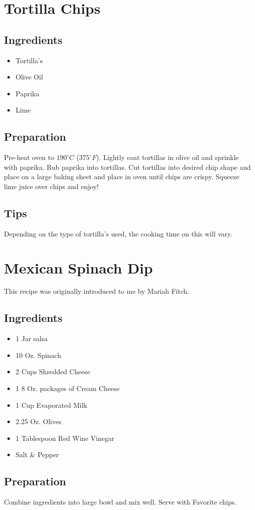 \thispagestyle{fancy}
\section{Tortilla Chips}
\AddToShipoutPicture*{\TortillaChips}

\subsection*{Ingredients}
\begin{multicols}{3}
	\begin{itemize}
		\item Tortilla's
		\item Olive Oil
		\item Paprika
		\item Lime
	\end{itemize}
\end{multicols}

\subsection*{Preparation}

Pre-heat oven to $190^\circ C$ ($375^\circ F$). Lightly coat tortillas in olive oil and sprinkle with paprika. Rub paprika into tortillas. Cut tortillas into desired chip shape and place on a large baking sheet and place in oven until chips are crispy. Squeeze lime juice over chips and enjoy!

\subsection*{Tips}

Depending on the type of tortilla's used, the cooking time on this will vary.
\vspace{2cm}
\section{Mexican Spinach Dip}

This recipe was originally introduced to me by Mariah Fitch.
\subsection*{Ingredients}
\begin{multicols}{3}
	\begin{itemize}
		\item 1 Jar salsa
		\item 10 Oz. Spinach
		\item 2 Cups Shredded Cheese
		\item 1 8 Oz. packages of Cream Cheese
		\item 1 Cup Evaporated Milk
		\item 2.25 Oz. Olives
		\item 1 Tablespoon Red Wine Vinegar
		\item Salt \& Pepper
	\end{itemize}
\end{multicols}

\subsection*{Preparation}

Combine ingredients into large bowl and mix well. Serve with Favorite chips.